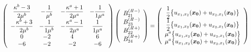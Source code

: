 \begin{align}
	\left(
	\begin{array}{cccc}
		{\displaystyle\frac{ \kappa^b-3}{2\mu^{b}}}& {\displaystyle-\frac{1}{\mu^{b}}} &
		{\displaystyle-\frac{\kappa^a+1}{2\mu^{a}}} & {\displaystyle-\frac{1}{1\mu^{a}}} \\
		{\displaystyle-\frac{\kappa^b+3}{2\mu^{b}}} & {\displaystyle-\frac{1}{1\mu^{b}}} &
		{\displaystyle-\frac{\kappa^a-1}{2\mu^{a}}} & {\displaystyle\frac{1}{1\mu^{a}}} \\
		0 & -2 & 4 & 6 \\
		-6 & -2 & -2 & -6\\
	\end{array}
	\right)
	\left(
	\begin{array}{c}
		B_{21}^{(I\hspace{-.15em}I-)} \\
	 	B_{23}^{(I\hspace{-.15em}I-)} \\
		B_{22}^{(I\hspace{-.15em}I+)}\\
	 	B_{24}^{(I\hspace{-.15em}I+)} \\
	\end{array}
	\right)
	=
	\left(
	\begin{array}{c}
		{\displaystyle\frac{1}{2}\bigl\{u_{x_{1},x_{2}}(\bm{x_{0}})+u_{x_{2},x_{1}}(\bm{x_{0}})\bigr\}} \\
	 	{\displaystyle\frac{1}{2}\bigl\{u_{x_{1},x_{2}}(\bm{x_{0}})+u_{x_{2},x_{1}}(\bm{x_{0}})\bigr\}} \\
		{\displaystyle\mu^a\bigl\{u_{x_{1},x_{2}}(\bm{x_{0}})+u_{x_{2},x_{1}}(\bm{x_{0}})\bigr\}} \\
	 	{\displaystyle\mu^a \bigl\{u_{x_{1},x_{2}}(\bm{x_{0}})+u_{x_{2},x_{1}}(\bm{x_{0}})\bigr\}} \\
	\end{array}
	\right)
\end{align}

